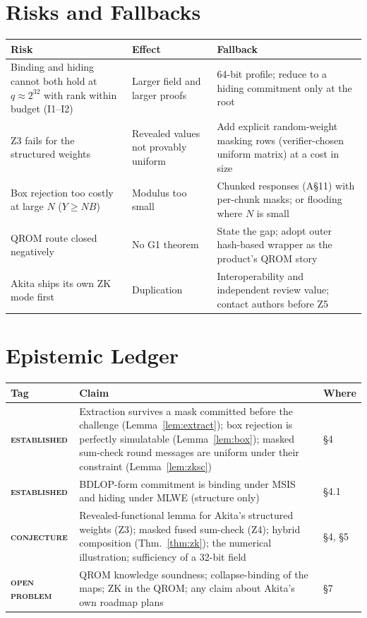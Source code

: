 \documentclass[11pt]{article}
\newcommand{\epitag}[3]{\colorbox{#2}{\textcolor{#1}{\textsc{\footnotesize\bfseries #3}}}}
\newcommand{\established}{\epitag{estgreen}{estbg}{established}}
\newcommand{\conjectureTag}{\epitag{conjyellow}{conjbg}{conjecture}}
\newcommand{\openproblem}{\epitag{openred}{openbg}{open problem}}
\renewcommand{\_}{\textunderscore\allowbreak{}}
\theoremstyle{definition}
\begin{document}
\section{Risks and Fallbacks}
\begin{center}
\small\renewcommand{\arraystretch}{1.2}
\begin{tabular}{@{}p{}p{}p{}@{}}
\toprule
\textbf{Risk} & \textbf{Effect} & \textbf{Fallback}\\
\midrule
Binding and hiding cannot both hold at $q\approx2^{32}$ with rank within budget (I1--I2) & Larger field and larger proofs & 64-bit profile; reduce to a hiding commitment only at the root\\
Z3 fails for the structured weights & Revealed values not provably uniform & Add explicit random-weight masking rows (verifier-chosen uniform matrix) at a cost in size\\
Box rejection too costly at large $N$ ($Y\ge NB$) & Modulus too small & Chunked responses (A\S11) with per-chunk masks; or flooding where $N$ is small\\
QROM route closed negatively & No G1 theorem & State the gap; adopt outer hash-based wrapper as the product's QROM story\\
Akita ships its own ZK mode first & Duplication & Interoperability and independent review value; contact authors before Z5\\
\bottomrule
\end{tabular}
\end{center}

\section{Epistemic Ledger}
\begin{center}
\small\renewcommand{\arraystretch}{1.2}
\begin{tabular}{@{}p{}p{}p{}@{}}
\toprule
\textbf{Tag} & \textbf{Claim} & \textbf{Where}\\
\midrule
\established & Extraction survives a mask committed before the challenge (Lemma~\ref{lem:extract}); box rejection is perfectly simulatable (Lemma~\ref{lem:box}); masked sum-check round messages are uniform under their constraint (Lemma~\ref{lem:zksc}) & \S4\\
\established & BDLOP-form commitment is binding under MSIS and hiding under MLWE (structure only) & \S4.1\\
\conjectureTag & Revealed-functional lemma for Akita's structured weights (Z3); masked fused sum-check (Z4); hybrid composition (Thm.~\ref{thm:zk}); the numerical illustration; sufficiency of a 32-bit field & \S4, \S5\\
\openproblem & QROM knowledge soundness; collapse-binding of the maps; ZK in the QROM; any claim about Akita's own roadmap plans & \S7\\
\bottomrule
\end{tabular}
\end{center}
\end{document}
